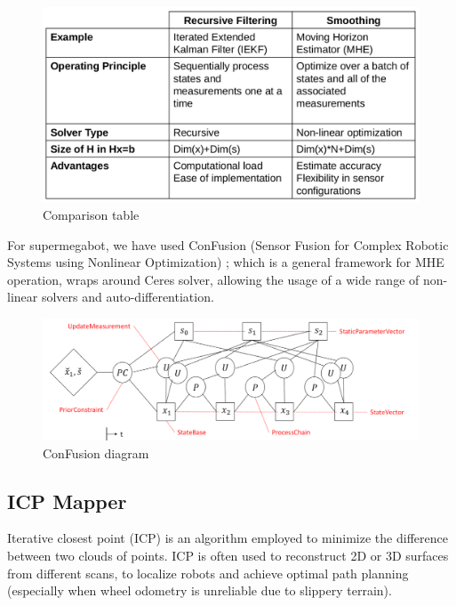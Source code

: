 \documentclass[a4paper,12pt]{article}
\begin{document}
\begin{figure}[H]
\centering
\includegraphics[width=\textwidth]{img/table.png}
\caption{Comparison table}
\label{fig:table}
\end{figure}

For supermegabot, we have used ConFusion \cite{2} (Sensor Fusion for Complex Robotic Systems using Nonlinear Optimization) ; which is a general framework for MHE operation, wraps around Ceres solver, allowing the usage of a wide range of non-linear solvers and auto-differentiation.
\begin{figure}[H]
\centering
\includegraphics[width=\textwidth]{img/conf.png}
\caption{ConFusion diagram}
\label{fig:conf}
\end{figure}

\newpage
\subsection{ICP Mapper}
Iterative closest point (ICP) \cite{4} \cite{5} \cite{6} is an algorithm employed to minimize the difference between two clouds of points. ICP is often used to reconstruct 2D or 3D surfaces from different scans, to localize robots and achieve optimal path planning (especially when wheel odometry is unreliable due to slippery terrain).\\
\end{document}
